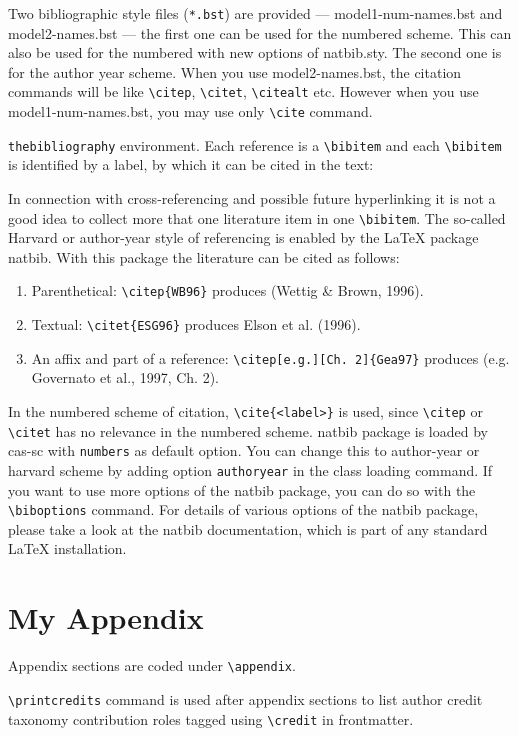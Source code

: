 \documentclass[a4paper,fleqn]{cas-sc}
\begin{document}
Two bibliographic style files (\verb+*.bst+) are provided ---
{model1-num-names.bst} and {model2-names.bst} --- the first one can be
used for the numbered scheme. This can also be used for the numbered
with new options of {natbib.sty}. The second one is for the author year
scheme. When  you use model2-names.bst, the citation commands will be
like \verb+\citep+,  \verb+\citet+, \verb+\citealt+ etc. However when
you use model1-num-names.bst, you may use only \verb+\cite+ command.

\verb+thebibliography+ environment.  Each reference is a
\verb+\bibitem+ and each \verb+\bibitem+ is identified by a label,
by which it can be cited in the text:

\noindent In connection with cross-referencing and
possible future hyperlinking it is not a good idea to collect
more that one literature item in one \verb+\bibitem+.  The
so-called Harvard or author-year style of referencing is enabled
by the \LaTeX{} package {natbib}. With this package the
literature can be cited as follows:


\begin{enumerate}[\textbullet]
\item Parenthetical: \verb+\citep{WB96}+ produces (Wettig \& Brown, 1996).
\item Textual: \verb+\citet{ESG96}+ produces Elson et al. (1996).
\item An affix and part of a reference:
\verb+\citep[e.g.][Ch. 2]{Gea97}+ produces (e.g. Governato et
al., 1997, Ch. 2).
\end{enumerate}

In the numbered scheme of citation, \verb+\cite{<label>}+ is used,
since \verb+\citep+ or \verb+\citet+ has no relevance in the numbered
scheme.  {natbib} package is loaded by {cas-sc} with
\verb+numbers+ as default option.  You can change this to author-year
or harvard scheme by adding option \verb+authoryear+ in the class
loading command.  If you want to use more options of the {natbib}
package, you can do so with the \verb+\biboptions+ command.  For
details of various options of the {natbib} package, please take a
look at the {natbib} documentation, which is part of any standard
\LaTeX{} installation.

\appendix
\section{My Appendix}
Appendix sections are coded under \verb+\appendix+.

\verb+\printcredits+ command is used after appendix sections to list
author credit taxonomy contribution roles tagged using \verb+\credit+
in frontmatter.
\end{document}
